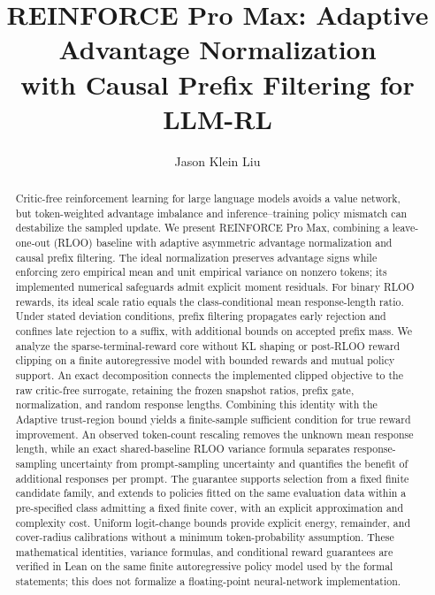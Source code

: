 \documentclass[11pt]{article}
\title{REINFORCE Pro Max: Adaptive Advantage Normalization\\
with Causal Prefix Filtering for LLM-RL}
\author{Jason Klein Liu}
\date{}
\begin{document}
\maketitle

\begin{abstract}
Critic-free reinforcement learning for large language models avoids a value
network, but token-weighted advantage imbalance and inference--training
policy mismatch can destabilize the sampled update. We present REINFORCE
Pro Max, combining a leave-one-out (RLOO) baseline with adaptive asymmetric
advantage normalization and causal prefix filtering. The ideal normalization
preserves advantage signs while enforcing zero empirical mean and unit
empirical variance on nonzero tokens; its implemented numerical safeguards
admit explicit moment residuals. For binary RLOO rewards, its ideal scale
ratio equals the class-conditional mean response-length ratio.
Under stated deviation conditions, prefix
filtering propagates early rejection and confines late rejection to a suffix,
with additional bounds on accepted prefix mass.
We analyze the sparse-terminal-reward core without KL shaping or post-RLOO
reward clipping on a finite autoregressive model with bounded rewards and
mutual policy support. An exact decomposition connects the implemented
clipped objective to the raw critic-free surrogate, retaining the frozen
snapshot ratios, prefix gate, normalization, and random response lengths.
Combining this identity with the Adaptive trust-region bound yields a
finite-sample sufficient condition for true reward improvement. An observed
token-count rescaling removes the unknown mean response length, while an
exact shared-baseline RLOO variance formula separates response-sampling
uncertainty from prompt-sampling uncertainty and quantifies the benefit of
additional responses per prompt. The guarantee supports selection from a
fixed finite candidate family, and extends to policies fitted on the same
evaluation data within a pre-specified class admitting a fixed finite cover,
with an explicit approximation and complexity cost. Uniform logit-change
bounds provide explicit energy, remainder, and cover-radius calibrations
without a minimum token-probability assumption. These mathematical
identities, variance formulas, and conditional reward guarantees are
verified in Lean on the same finite autoregressive policy model used by the
formal statements; this does not formalize a floating-point neural-network
implementation.
\end{abstract}



\end{document}
